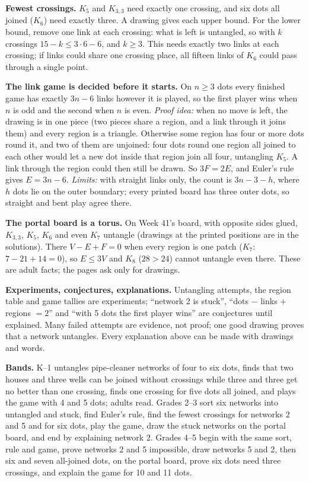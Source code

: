 \documentclass[11pt]{article}
\begin{document}
\textbf{Fewest crossings.} $K_5$ and $K_{3,3}$ need exactly one crossing, and six dots all joined ($K_6$) need exactly three. A drawing gives each upper bound. For the lower bound, remove one link at each crossing: what is left is untangled, so with $k$ crossings $15-k\le 3\cdot6-6$, and $k\ge3$. This needs exactly two links at each crossing; if links could share one crossing place, all fifteen links of $K_6$ could pass through a single point.

\textbf{The link game is decided before it starts.} On $n\ge3$ dots every finished game has exactly $3n-6$ links however it is played, so the first player wins when $n$ is odd and the second when $n$ is even. \emph{Proof idea:} when no move is left, the drawing is in one piece (two pieces share a region, and a link through it joins them) and every region is a triangle. Otherwise some region has four or more dots round it, and two of them are unjoined: four dots round one region all joined to each other would let a new dot inside that region join all four, untangling $K_5$. A link through the region could then still be drawn. So $3F=2E$, and Euler's rule gives $E=3n-6$. \emph{Limits:} with straight links only, the count is $3n-3-h$, where $h$ dots lie on the outer boundary; every printed board has three outer dots, so straight and bent play agree there.

\textbf{The portal board is a torus.} On Week 41's board, with opposite sides glued, $K_{3,3}$, $K_5$, $K_6$ and even $K_7$ untangle (drawings at the printed positions are in the solutions). There $V-E+F=0$ when every region is one patch ($K_7$: $7-21+14=0$), so $E\le 3V$ and $K_8$ ($28>24$) cannot untangle even there. These are adult facts; the pages ask only for drawings.

\textbf{Experiments, conjectures, explanations.} Untangling attempts, the region table and game tallies are experiments; ``network 2 is stuck'', ``dots $-$ links $+$ regions $=2$'' and ``with 5 dots the first player wins'' are conjectures until explained. Many failed attempts are evidence, not proof; one good drawing proves that a network untangles. Every explanation above can be made with drawings and words.

\textbf{Bands.} K--1 untangles pipe-cleaner networks of four to six dots, finds that two houses and three wells can be joined without crossings while three and three get no better than one crossing, finds one crossing for five dots all joined, and plays the game with 4 and 5 dots; adults read. Grades 2--3 sort six networks into untangled and stuck, find Euler's rule, find the fewest crossings for networks 2 and 5 and for six dots, play the game, draw the stuck networks on the portal board, and end by explaining network 2. Grades 4--5 begin with the same sort, rule and game, prove networks 2 and 5 impossible, draw networks 5 and 2, then six and seven all-joined dots, on the portal board, prove six dots need three crossings, and explain the game for 10 and 11 dots.
\end{document}
